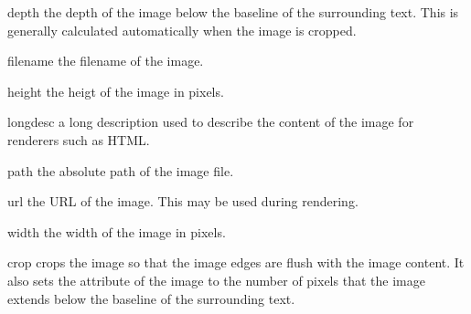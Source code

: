 \begin{memberdesc}[Image]{depth}
the depth of the image below the baseline of the 
surrounding text.  This is generally calculated automatically when
the image is cropped.
\end{memberdesc}

\begin{memberdesc}[Image]{filename}
the filename of the image.
\end{memberdesc}

\begin{memberdesc}[Image]{height}
the heigt of the image in pixels.
\end{memberdesc}

\begin{memberdesc}[Image]{longdesc}
a long description used to describe the content of 
the image for renderers such as HTML.
\end{memberdesc}

\begin{memberdesc}[Image]{path}
the absolute path of the image file.
\end{memberdesc}

\begin{memberdesc}[Image]{url}
the URL of the image.  This may be used during rendering.
\end{memberdesc}

\begin{memberdesc}[Image]{width}
the width of the image in pixels.
\end{memberdesc}


\begin{methoddesc}[Image]{crop}{}
crops the image so that the image edges are flush with the image 
content.  It also sets the  attribute of the image
to the number of pixels that the image extends below the baseline
of the surrounding text. 
\end{methoddesc}

